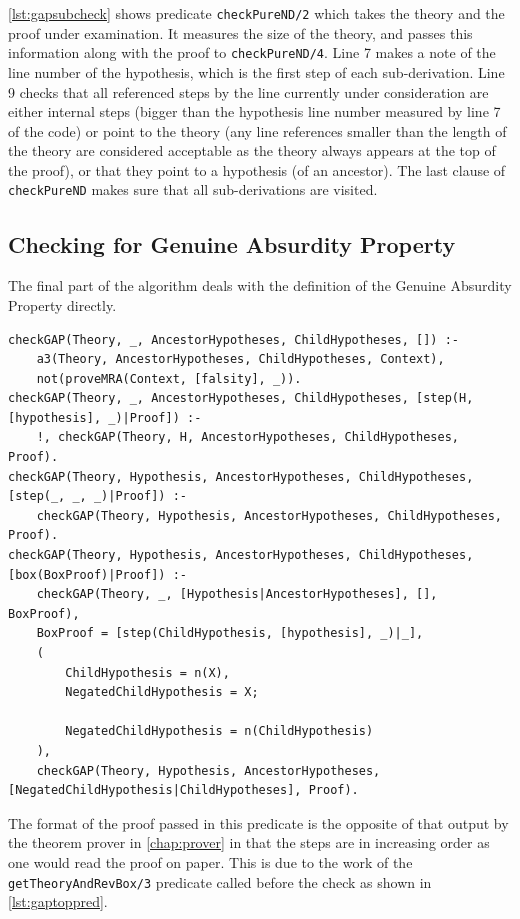 \documentclass[11pt,twoside,a4paper]{report}
\begin{document}
\autoref{lst:gapsubcheck} shows predicate \lstinline$checkPureND/2$ which takes the theory and the proof under examination. It measures the size of the theory, and passes this information along with the proof to \lstinline$checkPureND/4$. Line 7 makes a note of the line number of the hypothesis, which is the first step of each sub-derivation. Line 9 checks that all referenced steps by the line currently under consideration are either internal steps (bigger than the hypothesis line number measured by line 7 of the code) or point to the theory (any line references smaller than the length of the theory are considered acceptable as the theory always appears at the top of the proof), or that they point to a hypothesis (of an ancestor). The last clause of \lstinline$checkPureND$ makes sure that all sub-derivations are visited.

\subsection{Checking for Genuine Absurdity Property}
The final part of the algorithm deals with the definition of the Genuine Absurdity Property directly.

\begin{lstlisting}[caption={Checking whether a proof follows the Genuine Absurdity Property},label=lst:gapgapcheck]
checkGAP(Theory, _, AncestorHypotheses, ChildHypotheses, []) :-
	a3(Theory, AncestorHypotheses, ChildHypotheses, Context),
	not(proveMRA(Context, [falsity], _)).
checkGAP(Theory, _, AncestorHypotheses, ChildHypotheses, [step(H, [hypothesis], _)|Proof]) :-
	!, checkGAP(Theory, H, AncestorHypotheses, ChildHypotheses, Proof).
checkGAP(Theory, Hypothesis, AncestorHypotheses, ChildHypotheses, [step(_, _, _)|Proof]) :-
	checkGAP(Theory, Hypothesis, AncestorHypotheses, ChildHypotheses, Proof).
checkGAP(Theory, Hypothesis, AncestorHypotheses, ChildHypotheses, [box(BoxProof)|Proof]) :-
	checkGAP(Theory, _, [Hypothesis|AncestorHypotheses], [], BoxProof),
	BoxProof = [step(ChildHypothesis, [hypothesis], _)|_],
	(
		ChildHypothesis = n(X),
		NegatedChildHypothesis = X;
		
		NegatedChildHypothesis = n(ChildHypothesis)
	),
	checkGAP(Theory, Hypothesis, AncestorHypotheses, [NegatedChildHypothesis|ChildHypotheses], Proof).
\end{lstlisting}

The format of the proof passed in this predicate is the opposite of that output by the theorem prover in \autoref{chap:prover} in that the steps are in increasing order as one would read the proof on paper. This is due to the work of the \lstinline$getTheoryAndRevBox/3$ predicate called before the check as shown in \autoref{lst:gaptoppred}.
\end{document}
